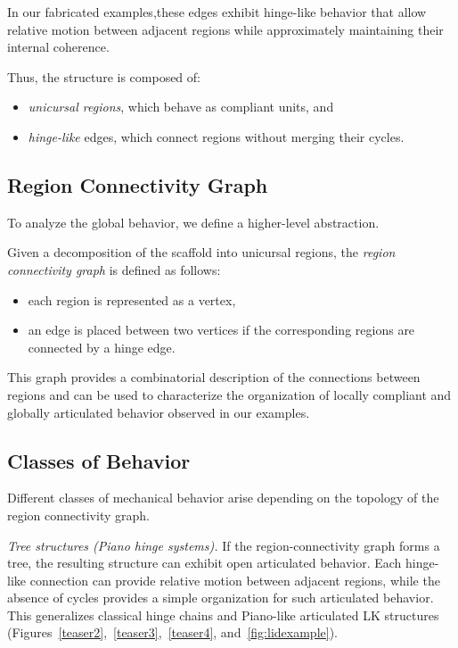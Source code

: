 \documentclass[acmtog]{acmart}
\begin{document}
In our fabricated examples,these edges exhibit hinge-like behavior that allow relative motion between adjacent regions while approximately maintaining their internal coherence.


Thus, the structure is composed of:
\begin{itemize}
    \item \emph{unicursal regions}, which behave as compliant units, and
    \item \emph{hinge-like} edges, which connect regions without merging
    their cycles.
\end{itemize}

\subsection{Region Connectivity Graph}

To analyze the global behavior, we define a higher-level abstraction.

\begin{definition}
Given a decomposition of the scaffold into unicursal regions, the
\emph{region connectivity graph} is defined as follows:
\begin{itemize}
    \item each region is represented as a vertex,
    \item an edge is placed between two vertices if the corresponding
    regions are connected by a hinge edge.
\end{itemize}
\end{definition}

This graph provides a combinatorial description of the connections between regions and can be used to characterize the organization of locally compliant and globally articulated behavior observed in our examples.

\subsection{Classes of Behavior}

Different classes of mechanical behavior arise depending on the
topology of the region connectivity graph.

\textit{Tree structures (Piano hinge systems).}
If the region-connectivity graph forms a tree, the resulting structure can exhibit open articulated behavior. Each hinge-like connection can provide relative motion between adjacent regions, while the absence of cycles provides a simple organization for such articulated behavior.
This generalizes classical hinge chains and Piano-like articulated LK structures (Figures~\ref{teaser2},~\ref{teaser3},~\ref{teaser4}, and~\ref{fig:lidexample}).
\end{document}
